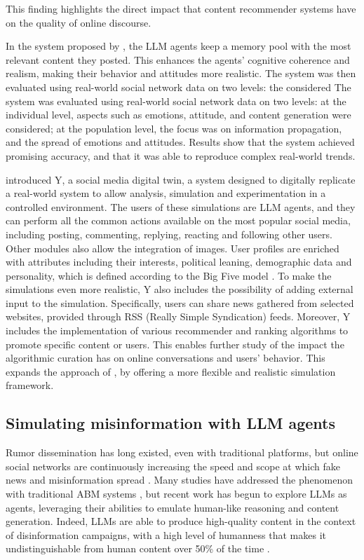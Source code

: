 This finding highlights the direct impact that content recommender systems have on the quality of online discourse.
\medskip

In the system proposed by \citet{gao2023s3socialnetworksimulationlarge}, the LLM agents keep a memory pool with the most relevant content they posted. This enhances the agents' cognitive coherence and realism, making their behavior and attitudes more realistic.
The system was then evaluated using real-world social network data on two levels: the considered The system was evaluated using real-world social network data on two levels: at the individual level, aspects such as emotions, attitude, and content generation were considered; at the population level, the focus was on information propagation, and the spread of emotions and attitudes. 
Results show that the system achieved promising accuracy, and that it was able to reproduce complex real-world trends.

\medskip
\citet{rossetti2024ysocialllmpoweredsocial} introduced Y, a social media digital twin, a system designed to digitally replicate a real-world system to allow analysis, simulation and experimentation in a controlled environment.
The users of these simulations are LLM agents, and they can perform all the common actions available on the most popular social media, including posting, commenting, replying, reacting and following other users. Other modules also allow the integration of images.
User profiles are enriched with attributes including their interests, political leaning, demographic data and personality, which is defined according to the Big Five model \cite{barrick1991bigfive, McCrae1992}.
To make the simulations even more realistic, Y also includes the possibility of adding external input to the simulation. Specifically, users can share news gathered from selected websites, provided through RSS (Really Simple Syndication) feeds.
Moreover, Y includes the implementation of various recommender and ranking algorithms to promote specific content or users. This enables further study of the impact the algorithmic curation has on online conversations and users' behavior. This expands the approach of \citet{törnberg2023evaluate}, by offering a more flexible and realistic simulation framework.



\subsection{Simulating misinformation with LLM agents}
Rumor dissemination has long existed, even with traditional platforms, but online social networks are continuously increasing the speed and scope at which fake news and misinformation spread \cite{aimeur2023fake}. 
Many studies have addressed the phenomenon with traditional ABM systems \cite{gausen2021can, sulis2020, muhammad2024agent}, but recent work has begun to explore LLMs as agents, leveraging their abilities to emulate human-like reasoning and content generation.
Indeed, LLMs are able to produce high-quality content in the context of disinformation campaigns, with a high level of humanness that makes it undistinguishable from human content over 50\% of the time \cite{williams2025hqdisinformation}.

